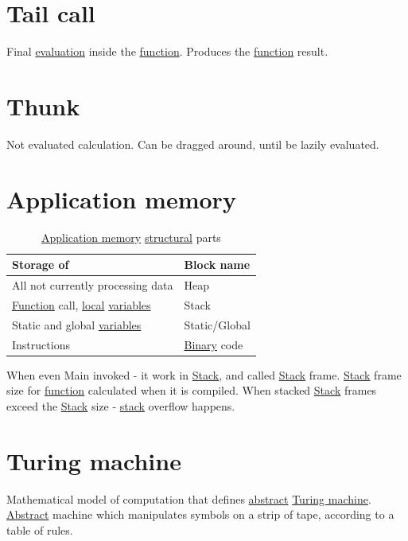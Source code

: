 \documentclass[a4paper,14pt,oneside]{book}
\begin{document}
\section{\label{orgcf2ca14}Tail call}
\label{sec:orgd18fbed}
Final \hyperref[org1702d40]{evaluation} inside the \hyperref[org1a6611b]{function}. Produces the \hyperref[org1a6611b]{function} result.

\section{\label{org320ad6c}Thunk}
\label{sec:org9a5f0bc}
Not evaluated calculation. Can be dragged around, until be lazily evaluated.

\section{\label{org7cefd39}Application memory}
\label{sec:orgaa565ec}
\begin{table}[htbp]
\caption{\label{tab--application-memory-structural-parts}\hyperref[org7cefd39]{Application memory} \hyperref[org4899c80]{structural} parts}
\centering
\begin{tabu} spread \linewidth {ll}
\toprule
Storage of & Block name\\
\midrule
All not currently processing data & \label{org27f3ec2}Heap\\
\hyperref[org1a6611b]{Function} call, \hyperref[org223c105]{local} \hyperref[orgea860d1]{variables} & \label{org8132915}Stack\\
Static and global \hyperref[orgea860d1]{variables} & Static/Global\\
Instructions & \hyperref[orgadebdb8]{Binary} code\\
\bottomrule
\end{tabu}
\end{table}

When even Main invoked - it work in \hyperref[org8132915]{Stack}, and called \hyperref[org8132915]{Stack} frame. \hyperref[org8132915]{Stack} frame size for \hyperref[org1a6611b]{function} calculated when it is compiled.
When stacked \hyperref[org8132915]{Stack} frames exceed the \hyperref[org8132915]{Stack} size - \hyperref[org8132915]{stack} overflow happens.

\section{\label{org1c13f5b}Turing machine}
\label{sec:org8f64aef}
Mathematical model of computation that defines \hyperref[orgb7bd289]{abstract} \hyperref[org1c13f5b]{Turing machine}. \hyperref[orgb7bd289]{Abstract} machine which manipulates symbols on a strip of tape, according to a table of rules.
\end{document}
